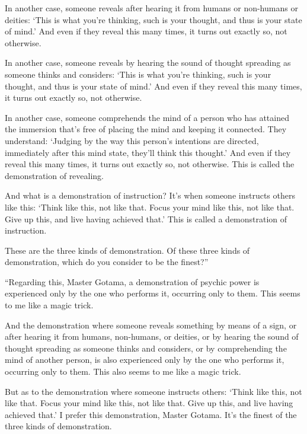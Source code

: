 \documentclass[12pt,openany]{book}%
\begin{document}
In another case, someone reveals after hearing it from humans or non-humans or deities: ‘This is what you’re thinking, such is your thought, and thus is your state of mind.’ And even if they reveal this many times, it turns out exactly so, not otherwise. 

In another case, someone reveals by hearing the sound of thought spreading as someone thinks and considers: ‘This is what you’re thinking, such is your thought, and thus is your state of mind.’ And even if they reveal this many times, it turns out exactly so, not otherwise. 

In another case, someone comprehends the mind of a person who has attained the immersion that’s free of placing the mind and keeping it connected. They understand: ‘Judging by the way this person’s intentions are directed, immediately after this mind state, they’ll think this thought.’ And even if they reveal this many times, it turns out exactly so, not otherwise. This is called the demonstration of revealing. 

And what is a demonstration of instruction? It’s when someone instructs others like this: ‘Think like this, not like that. Focus your mind like this, not like that. Give up this, and live having achieved that.’ This is called a demonstration of instruction. 

These are the three kinds of demonstration. Of these three kinds of demonstration, which do you consider to be the finest?” 

“Regarding this, Master Gotama, a demonstration of psychic power is experienced only by the one who performs it, occurring only to them. This seems to me like a magic trick. 

And the demonstration where someone reveals something by means of a sign, or after hearing it from humans, non-humans, or deities, or by hearing the sound of thought spreading as someone thinks and considers, or by comprehending the mind of another person, is also experienced only by the one who performs it, occurring only to them. This also seems to me like a magic trick. 

But as to the demonstration where someone instructs others: ‘Think like this, not like that. Focus your mind like this, not like that. Give up this, and live having achieved that.’ I prefer this demonstration, Master Gotama. It’s the finest of the three kinds of demonstration. 
\end{document}
